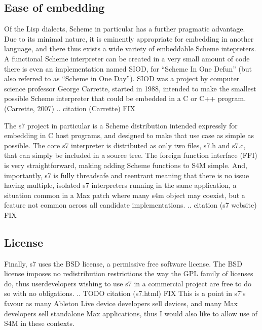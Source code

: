 \documentclass[letterpaper,10pt,english]{sphinxmanual}
\begin{document}
\subsection{Ease of embedding}
\label{\detokenize{design:ease-of-embedding}}
\sphinxAtStartPar
Of the Lisp dialects, Scheme in particular has a further pragmatic advantage.
Due to its minimal nature, it is eminently appropriate for embedding in another language,
and there thus exists a wide variety of embeddable Scheme intepreters.
A functional Scheme interpreter can be created in a very small amount of code \sphinxhyphen{}
there is even an implementation named SIOD, for “Scheme In One Defun” (but also referred to as “Scheme in One Day”).
SIOD was a project by computer science professor George Carrette, started in 1988, intended to make
the smallest possible Scheme interpreter that could be embedded in a C or C++ program. (Carrette, 2007)
.. citation (Carrette) FIX

\sphinxAtStartPar
The s7 project in particular is a Scheme distribution intended expressly for embedding in C host programs, and
designed to make that use case as simple as possible.
The core s7 interpreter is distributed as only two files, s7.h and s7.c, that can simply be included in a source tree.
The foreign function interface (FFI) is very straightforward, making adding Scheme functions to S4M simple.
And, importantly, s7 is fully thread\sphinxhyphen{}safe and re\sphinxhyphen{}entrant \sphinxhyphen{} meaning that there is no issue having multiple, isolated s7 interpreters
running in the same application, a situation common in a Max patch where many s4m object may coexist, but a feature
not common across all candidate implementations.
.. citation (s7 website) FIX


\subsection{License}
\label{\detokenize{design:license}}
\sphinxAtStartPar
Finally, s7 uses the BSD license, a permissive free software license.
The BSD license imposes no redistribution restrictions the way the GPL family of licenses do, thus user\sphinxhyphen{}developers wishing to
use s7 in a commercial project are free to do so with no obligations.
.. TODO citation (s7.html) FIX
This is a point in s7’s favour as many Ableton Live device developers sell devices, and many Max developers sell standalone Max
applications, thus I would also like to allow use of S4M in these contexts.

\sphinxstepscope
\end{document}
